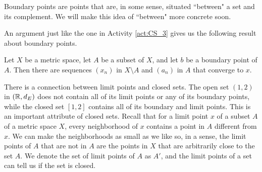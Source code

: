\begin{comment}

\ActivitySolution

\ba
\item Suppose $(a_n)$ is a sequence in $A$ that converges to $a$. Let $N$ be a neighborhood of $a$ in $X$ such that $A \cap N = \{a\}$. Since $N$ is a neighborhood of $a$, there is an open ball $B(a,\epsilon)$ that is a subset of $N$.  The fact that $(a_n)$ converges to $a$ means that there is a positive integer $K$ such that $k \geq K$ implies that $d(a_k,a) < \epsilon$. Then $a_k \in (A \cap N)$ and so $a_k = a$.  

\item We prove the contrapositive. Assume that $a$ is not an isolated point of $A$. We will show that there is a sequence in $A$ that converges to $a$ that is not eventually constant. For each positive integer $n$, we know that $B\left(x, \frac{1}{n}\right)$ is a neighborhood of $a$. Since $a$ is not a limit point of $A$, it follows that $B\left(x, \frac{1}{n}\right) \cap A$ contains an element $a_n$ of $A$ different from $a$.But then $(a_n)$ is a sequence in $A$ that converges to $a$ with $a_n \neq a$ for every $n$.  

\ea

\end{comment}

Boundary points are points that are, in some sense, situated ``between" a set and its complement. We will make this idea of ``between" more concrete soon. 

An argument just like the one in Activity \ref{act:CS_3} gives us the following result about boundary points. 

\begin{theorem} \label{thm:CS_2} Let $X$ be a metric space, let $A$ be a subset of $X$, and let $b$ be a boundary point of $A$. Then there are sequences $(x_n)$ in $X \setminus A$ and $(a_n)$ in $A$ that converge to $x$.
\end{theorem}

\label{sec_limit_closed}

There is a connection between limit points and closed sets. The open set $(1,2)$ in $(\mathbb{R}, d_E)$ does not contain all of its limit points or any of its boundary points, while the closed set $[1,2]$ contains all of its boundary and limit points. This is an important attribute of closed sets. Recall that for a limit point $x$ of a subset $A$ of a metric space $X$, every neighborhood of $x$ contains a point in $A$ different from $x$. We can make the neighborhoods as small as we like so, in a sense, the limit points of $A$ that are not in $A$ are the points in $X$ that are arbitrarily close to the set $A$. We denote the set of limit points of $A$ as $A'$, and the limit points of a set can tell us if the set is closed.

